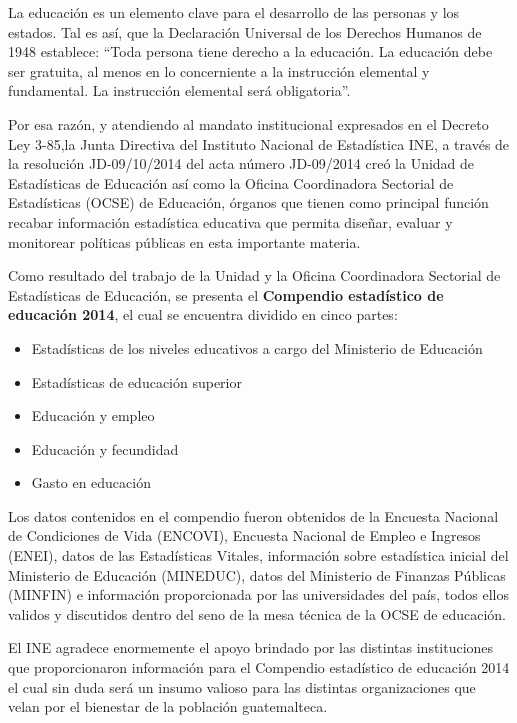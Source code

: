 
$\ $\\[1cm]

\tableofcontents

\cleardoublepage
	\pagestyle{estandar}
	\setcounter{page}{1}
	\setlength{\arrayrulewidth}{1.0pt}





\cleardoublepage


$\ $\\[2cm]

 La educación es un elemento clave para el desarrollo de las personas y los estados. Tal es así, que la Declaración Universal de los Derechos Humanos de 1948 establece: “Toda persona tiene derecho a la educación. La educación debe ser gratuita, al menos en lo concerniente a la instrucción elemental y fundamental. La instrucción elemental será obligatoria”.
 
 Por esa razón, y atendiendo al mandato institucional expresados en el Decreto Ley 3-85,la Junta Directiva del Instituto Nacional de Estadística INE, a través de la resolución JD-09/10/2014 del acta número JD-09/2014 creó la Unidad de Estadísticas de Educación así como la Oficina Coordinadora Sectorial de Estadísticas (OCSE) de Educación, órganos que tienen como principal función recabar información estadística educativa que permita diseñar, evaluar y monitorear políticas públicas en esta importante materia.
 
 Como resultado del trabajo de la Unidad y la Oficina Coordinadora Sectorial de Estadísticas de Educación, se presenta el \textbf{Compendio estadístico de educación 2014}, el cual se encuentra dividido en cinco partes:
 
\begin{itemize}
	\item Estadísticas de los niveles educativos a cargo del Ministerio de  Educación
	\item Estadísticas de educación superior
	\item Educación y empleo
	\item Educación y fecundidad
	\item Gasto en educación
\end{itemize}


Los datos contenidos en el compendio fueron obtenidos de la Encuesta Nacional de Condiciones de Vida (ENCOVI), Encuesta Nacional de Empleo e Ingresos (ENEI), datos de las Estadísticas Vitales, información sobre estadística inicial del Ministerio de Educación (MINEDUC), datos del Ministerio de Finanzas Públicas (MINFIN) e información proporcionada por las universidades del país, todos ellos validos y discutidos dentro del seno de la mesa técnica de la OCSE de educación.

El INE agradece enormemente el apoyo brindado por las distintas instituciones que proporcionaron información para el Compendio estadístico de educación 2014 el cual sin duda será un insumo valioso para las distintas organizaciones que velan por el bienestar de la población guatemalteca.

\restoregeometry